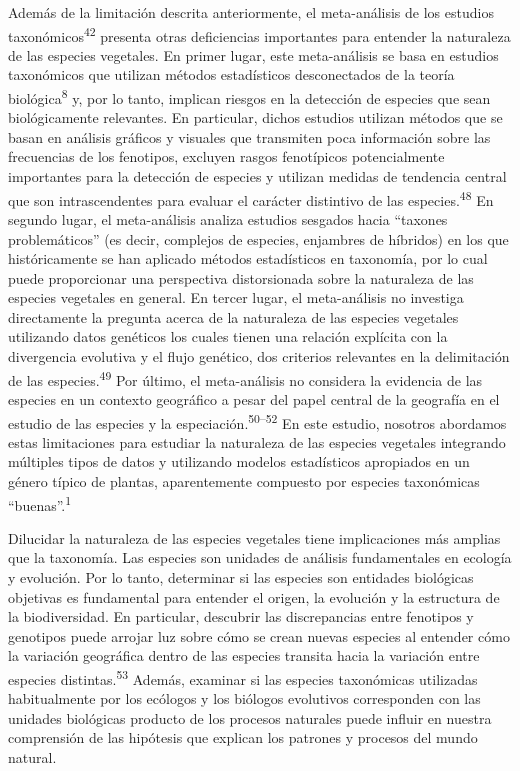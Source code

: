 \documentclass[
  11pt,
]{article}
\begin{document}
Además de la limitación descrita anteriormente, el meta-análisis de los estudios taxonómicos\textsuperscript{42} presenta otras deficiencias importantes para entender la naturaleza de las especies vegetales. En primer lugar, este meta-análisis se basa en estudios taxonómicos que utilizan métodos estadísticos desconectados de la teoría biológica\textsuperscript{8} y, por lo tanto, implican riesgos en la detección de especies que sean biológicamente relevantes. En particular, dichos estudios utilizan métodos que se basan en análisis gráficos y visuales que transmiten poca información sobre las frecuencias de los fenotipos, excluyen rasgos fenotípicos potencialmente importantes para la detección de especies y utilizan medidas de tendencia central que son intrascendentes para evaluar el carácter distintivo de las especies.\textsuperscript{48} En segundo lugar, el meta-análisis analiza estudios sesgados hacia ``taxones problemáticos'' (es decir, complejos de especies, enjambres de híbridos) en los que históricamente se han aplicado métodos estadísticos en taxonomía, por lo cual puede proporcionar una perspectiva distorsionada sobre la naturaleza de las especies vegetales en general. En tercer lugar, el meta-análisis no investiga directamente la pregunta acerca de la naturaleza de las especies vegetales utilizando datos genéticos los cuales tienen una relación explícita con la divergencia evolutiva y el flujo genético, dos criterios relevantes en la delimitación de las especies.\textsuperscript{49} Por último, el meta-análisis no considera la evidencia de las especies en un contexto geográfico a pesar del papel central de la geografía en el estudio de las especies y la especiación.\textsuperscript{50--52} En este estudio, nosotros abordamos estas limitaciones para estudiar la naturaleza de las especies vegetales integrando múltiples tipos de datos y utilizando modelos estadísticos apropiados en un género típico de plantas, aparentemente compuesto por especies taxonómicas ``buenas''.\textsuperscript{1}

Dilucidar la naturaleza de las especies vegetales tiene implicaciones más amplias que la taxonomía. Las especies son unidades de análisis fundamentales en ecología y evolución. Por lo tanto, determinar si las especies son entidades biológicas objetivas es fundamental para entender el origen, la evolución y la estructura de la biodiversidad. En particular, descubrir las discrepancias entre fenotipos y genotipos puede arrojar luz sobre cómo se crean nuevas especies al entender cómo la variación geográfica dentro de las especies transita hacia la variación entre especies distintas.\textsuperscript{53} Además, examinar si las especies taxonómicas utilizadas habitualmente por los ecólogos y los biólogos evolutivos corresponden con las unidades biológicas producto de los procesos naturales puede influir en nuestra comprensión de las hipótesis que explican los patrones y procesos del mundo natural.
\end{document}
